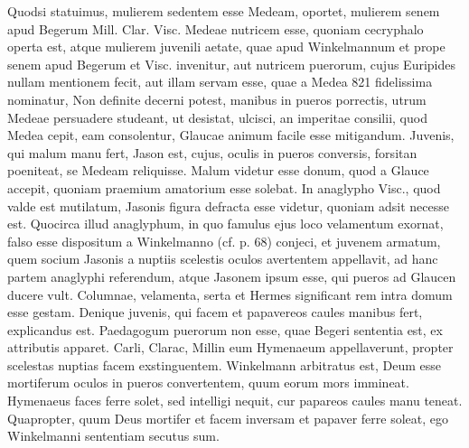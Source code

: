 \documentclass[landscape, a4paper, 11pt, oneside, polutonikogreek, german]{article}
\begin{document}
Quodsi statuimus, mulierem sedentem esse Medeam, oportet, mulierem senem apud Begerum Mill. Clar. Visc. Medeae nutricem esse, quoniam cecryphalo operta est, atque mulierem juvenili aetate, quae apud Winkelmannum et prope senem apud Begerum et Visc. invenitur, aut nutricem puerorum, cujus Euripides nullam mentionem fecit, aut illam servam esse, quae a Medea 821 fidelissima nominatur, Non definite decerni potest, manibus in pueros porrectis, utrum Medeae persuadere studeant, ut desistat, ulcisci, an imperitae consilii, quod Medea cepit, eam consolentur, Glaucae animum facile esse mitigandum. Juvenis, qui malum manu fert, Jason est, cujus, oculis in pueros conversis, forsitan poeniteat, se Medeam reliquisse. Malum videtur esse donum, quod a Glauce accepit, quoniam praemium amatorium esse solebat. In anaglypho Visc., quod valde est mutilatum, Jasonis figura defracta esse videtur, quoniam adsit necesse est. Quocirca illud anaglyphum, in quo famulus ejus loco velamentum exornat, falso esse dispositum a Winkelmanno (cf. p. 68) conjeci, et juvenem armatum, quem socium Jasonis a nuptiis scelestis oculos avertentem appellavit, ad hanc partem anaglyphi referendum, atque Jasonem ipsum esse, qui pueros ad Glaucen ducere vult. Columnae, velamenta, serta et Hermes significant rem intra domum esse gestam. Denique juvenis, qui facem et papavereos caules manibus fert, explicandus est. Paedagogum puerorum non esse, quae Begeri sententia est, ex attributis apparet. Carli, Clarac, Millin eum Hymenaeum appellaverunt, propter scelestas nuptias facem exstinguentem. Winkelmann arbitratus est, Deum esse mortiferum oculos in pueros convertentem, quum eorum mors immineat. Hymenaeus faces ferre solet, sed intelligi nequit, cur papareos caules manu teneat. Quapropter, quum Deus mortifer et facem inversam et papaver ferre soleat, ego Winkelmanni sententiam secutus sum.
\end{document}
